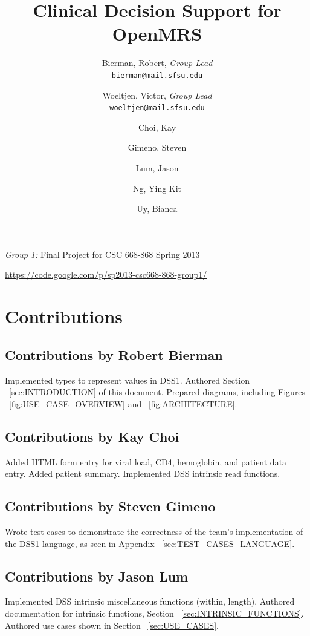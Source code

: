 \documentclass[12pt,letterpaper]{article}
\title{
  Clinical Decision Support for OpenMRS
}
\author{
        Bierman, Robert,  \emph{Group Lead}  \\ \texttt{bierman@mail.sfsu.edu} \and 
        Woeltjen, Victor, \emph{Group Lead}  \\ \texttt{woeltjen@mail.sfsu.edu} \and
        Choi, Kay       \and
        Gimeno, Steven  \and
        Lum, Jason      \and
        Ng, Ying Kit    \and
        Uy, Bianca      
}
\begin{document}
\newpage 

\maketitle
\begin{center}
\begin{Large}\emph{Group 1:} Final Project for CSC 668-868 Spring 2013\end{Large} \linebreak
\url{https://code.google.com/p/sp2013-csc668-868-group1/}
\end{center}
\thispagestyle{empty} %

\newpage {}
\tableofcontents


\newpage {}
\section{Contributions} 

\subsection{Contributions by Robert Bierman}
Implemented types to represent values in DSS1. Authored Section 
~\ref{sec:INTRODUCTION} of this document. Prepared diagrams, including 
Figures ~\ref{fig:USE_CASE_OVERVIEW} and ~\ref{fig:ARCHITECTURE}.

\subsection{Contributions by Kay Choi}
Added HTML form entry for viral load, CD4, hemoglobin, and 
patient data entry. Added patient summary. Implemented DSS intrinsic read 
functions.

\subsection{Contributions by Steven Gimeno}
Wrote test cases to demonstrate the correctness of the team's implementation 
of the DSS1 language, as seen in Appendix ~\ref{sec:TEST_CASES_LANGUAGE}.

\subsection{Contributions by Jason Lum}
Implemented DSS intrinsic miscellaneous functions (within, length). 
Authored documentation for intrinsic functions, Section ~\ref{sec:INTRINSIC_FUNCTIONS}. Authored use cases shown in Section ~\ref{sec:USE_CASES}.
\end{document}
